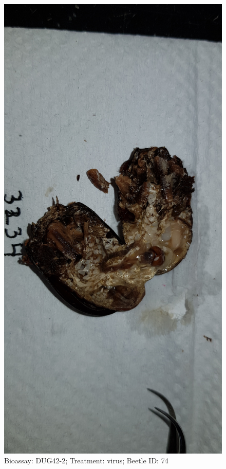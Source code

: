 \documentclass[11pt]{scrartcl}
\begin{document}
\begin{figure}[h!]
    \centering
    \includegraphics[width=\linewidth, height=\textheight, keepaspectratio]{uploads/btl.pm_image.b38f50ea460c96da.447567343220333233345f5265702d322076697275732e6a7067.jpg}
    \caption{Bioassay: DUG42-2; Treatment: virus; Beetle ID: 74}
\end{figure}
\clearpage
\end{document}
